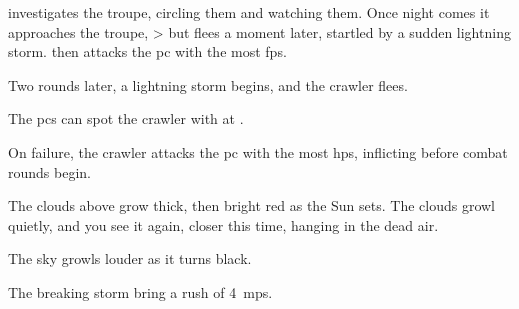 investigates the troupe, circling them and watching them.
Once night comes it approaches the troupe,
\ifnum\value{r12}>\value{hp}%
  but flees a moment later, startled by a sudden lightning storm.
\else%
  then attacks the \gls{pc} with the most \glspl{fp}.

  Two \glspl{round} later, a lightning storm begins, and the \gls{crawler} flees.
\fi

\chitincrawler
\label{crawlerStatblock}

The \glspl{pc} can spot the \gls{crawler} with 
at \tn.
\addtocounter{damage}{2}
On failure, the \gls{crawler} attacks the \gls{pc} with the most \glspl{hp}, inflicting  before combat \glspl{round} begin.

\begin{boxtext}
  The clouds above grow thick, then bright red as the Sun sets.
  The clouds growl quietly, and you see it again, closer this time, hanging in the dead air.

  The sky growls louder as it turns black.
\end{boxtext}

The breaking storm bring a rush of 4~\glspl{mp}.
